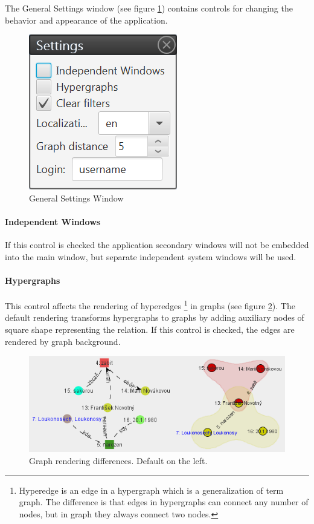 The General Settings window (see figure \ref{fig:GeneralSettings}) contains
controls for changing the behavior and appearance of the application.

\begin{figure}[!htb]
        \centering
        \includegraphics{Images/general}
        \caption{General Settings Window}
        \label{fig:GeneralSettings}
\end{figure}

\paragraph{Independent Windows} If this control is checked the application
secondary windows will not be embedded into the main window, but separate
independent system windows will be used.

\paragraph{Hypergraphs} This control affects the rendering of hyperedges%
\footnote{Hyperedge is an edge in a hypergraph which is a generalization of
term graph. The difference is that edges in hypergraphs can connect any number
of nodes, but in graph they always connect two nodes.}
in graphs (see figure \ref{fig:Hypergraphs}). The default rendering transforms
hypergraphs to graphs by adding auxiliary nodes of square shape representing
the relation. If this control is checked, the edges are rendered by graph
background.

\begin{figure}[!htb]
        \centering
        \includegraphics[width=\textwidth]{Images/hypergraphs}
        \caption{Graph rendering differences. Default on the left.}
        \label{fig:Hypergraphs}
\end{figure}

